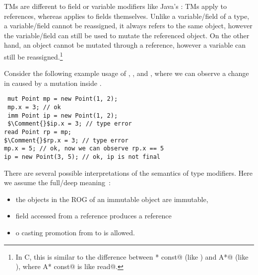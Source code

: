 \noindent TMs are different to field or variable modifiers like Java's \Q@final@: TMs apply to references, whereas \Q@final@ applies to fields themselves. Unlike a variable/field of a \Q@read@ type, a \Q@final@ variable/field cannot be reassigned, it always refers to the same object, however the variable/field can still be used to mutate the referenced object.
On the other hand, an object cannot be mutated through a \Q@read@ reference, however a \Q@read@ variable can still be reassigned.\footnote{In C, this is similar to the difference between \Q@A* const@ (like \Q@final@) and \Q@const A*@ (like \Q@read@), where \Q@const A* const@ is like \Q@final read@.}

Consider the following  example usage of \Q@mut@, \Q@imm@, and \Q@read@, where we can observe a change in \Q@rp@ caused by a mutation inside \Q@mp@.
\begin{lstlisting}
 mut Point mp = new Point(1, 2);
 mp.x = 3; // ok
 imm Point ip = new Point(1, 2);
 $\Comment{}$ip.x = 3; // type error
read Point rp = mp;
$\Comment{}$rp.x = 3; // type error
mp.x = 5; // ok, now we can observe rp.x == 5
ip = new Point(3, 5); // ok, ip is not final
\end{lstlisting} 

There are several possible interpretations of the semantics of type modifiers.
Here we assume the full/deep meaning~\cite{ZibinEtAl10,Potanin2013}:
\begin{itemize}
  \item {} the objects in the ROG of an immutable object are  immutable,
  \item {}  field accessed from a \Q@read@ reference produces a \Q@read@ reference\IODel{,}
  \item {}o casting \IODel{/}  promotion from \Q@read@ to \Q@mut@ is allowed.
\end{itemize}

